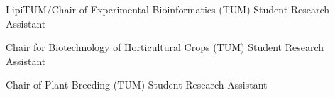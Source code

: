{%
	LipiTUM/Chair of Experimental Bioinformatics (TUM)
}
{%
	Student Research Assistant
}
{%
}

{%
	Chair for Biotechnology of Horticultural Crops (TUM)
}
{%
	Student Research Assistant
}
{%
}

{%
	Chair of Plant Breeding (TUM)
}
{%
	Student Research Assistant
}
{%
}
